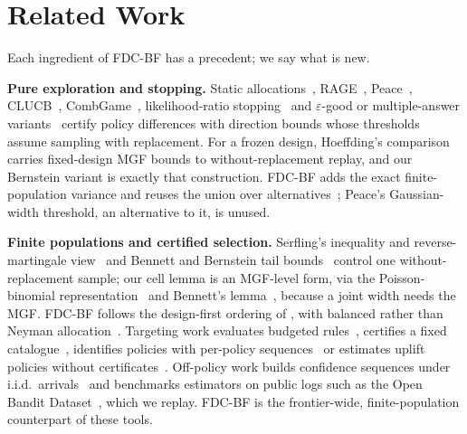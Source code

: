 \documentclass[sigconf,anonymous,review]{acmart}
\newcommand{\eps}{\varepsilon}
\begin{document}
\section{Related Work}\label{sec:related}

Each ingredient of FDC-BF has a precedent; we say what is new.

\textbf{Pure exploration and stopping.} Static allocations~\citep{soare2014best}, RAGE~\citep{fiez2019sequential}, Peace~\citep{katzsamuels2020empirical}, CLUCB~\citep{chen2014combinatorial,chen2017nearly}, CombGame~\citep{jourdan2021efficient}, likelihood-ratio stopping~\citep{garivier2016optimal} and $\eps$-good or multiple-answer variants~\citep{degenne2019pure,jourdan2022choosing,jamieson2018bandit} certify policy differences with direction bounds whose thresholds assume sampling with replacement. For a frozen design, Hoeffding's comparison~\citep{hoeffding1963probability} carries fixed-design MGF bounds to without-replacement replay, and our Bernstein variant is exactly that construction. FDC-BF adds the exact finite-population variance and reuses the union over alternatives~\citep{deheide2026union}; Peace's Gaussian-width threshold, an alternative to it, is unused.

\textbf{Finite populations and certified selection.} Serfling's inequality and reverse-martingale view~\citep{serfling1974probability,bardenet2015concentration} and Bennett and Bernstein tail bounds~\citep{greene2017exponential} control one without-replacement sample; our cell lemma is an MGF-level form, via the Poisson-binomial representation~\citep{vatutin1982limit,tang2023poisson} and Bennett's lemma~\citep{bennett1962probability}, because a joint width needs the MGF. FDC-BF follows the design-first ordering of \citet{hait2026target}, with balanced rather than Neyman allocation~\citep{neyman1934two,kato2024generalized,dang2026target}. Targeting work evaluates budgeted rules~\citep{imai2023experimental,li2024neyman}, certifies a fixed catalogue~\citep{shekhar2026support}, identifies policies with per-policy sequences~\citep{molitor2026anytime} or estimates uplift policies without certificates~\citep{sverdrup2023qini,athey2021policy}. Off-policy work builds confidence sequences under i.i.d.\ arrivals~\citep{karampatziakis2021off,waudbysmith2024anytime,thomas2015high,cho2024cspimt} and benchmarks estimators on public logs such as the Open Bandit Dataset~\citep{saito2021open}, which we replay. FDC-BF is the frontier-wide, finite-population counterpart of these tools.
\end{document}

